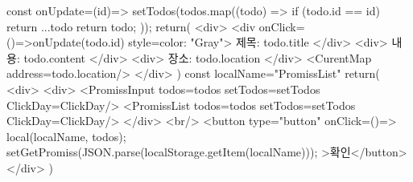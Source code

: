 {{        const onUpdate=(id)=>{
            setTodos(todos.map((todo) => {
                if (todo.id == id) return {...todo}
                return todo;
            }));
        }
        return(
            <div>
                <div onClick={()=>onUpdate(todo.id)} style={{color: "Gray"}}>
                    제목: {todo.title}
                </div>
                <div>
                    내용: {todo.content}
                </div>
                <div>
                    장소: {todo.location}
                </div>
                <CurentMap address={todo.location}/>
            </div>
        )
    }
    const localName="PromissList"
    return(
        <div>
            <div>
                <PromissInput todos={todos} setTodos={setTodos} ClickDay={ClickDay}/>
                <PromissList todos={todos} setTodos={setTodos} ClickDay={ClickDay}/>
            </div>
            <br/>
            <button type={"button"} onClick={()=>{
                local(localName, todos);
                setGetPromiss(JSON.parse(localStorage.getItem(localName)));
            }}>확인</button>
        </div>
    )
}